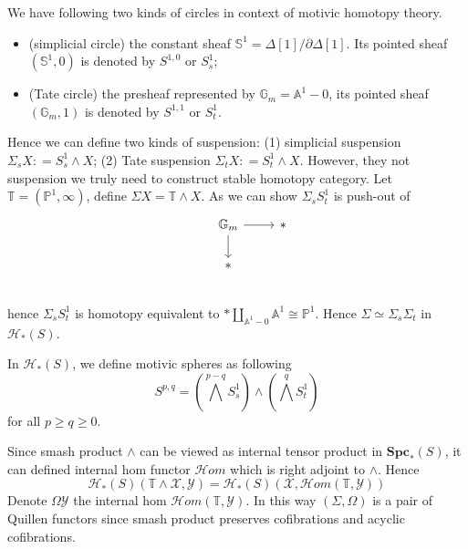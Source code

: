 \documentclass[b5paper,10pt]{article}
\begin{document}
We have following two kinds of circles in context of motivic homotopy theory.
\begin{itemize}
	\item(simplicial circle) the constant sheaf $\mathbb{S}^1= \Delta[1]/\partial \Delta[1]$. Its pointed sheaf $(\mathbb{S}^1,0)$ is denoted by $S^{1,0}$ or $S_s^1$;
	\item(Tate circle) the presheaf represented by $\mathbb{G}_m = \mathbb{A}^1-0$, its pointed sheaf $(\mathbb{G}_m,1)$ is denoted by $S^{1,1}$ or $S_t^1$.
\end{itemize}
Hence we can define two kinds of suspension: (1) simplicial suspension $\Sigma_s X \colon = S^1_s \wedge X$; (2) Tate suspension $\Sigma_t X \colon = S_t^1 \wedge X$. However, they not suspension we truly need to construct stable homotopy category. Let $\mathbb{T} = (\mathbb{P}^1,\infty)$, define $\Sigma X = \mathbb{T} \wedge X$. As we can show $\Sigma_s S^1_t$ is  push-out of 
\[
\begin{tikzcd}
&\mathbb{G}_m \ar[r] \ar[d]& * \\
&* &\\
\end{tikzcd}
\]
hence $\Sigma_s S^1_t$ is homotopy equivalent to $* \coprod_{\mathbb{A}^1-0} \mathbb{A}^1 \cong \mathbb{P}^1$. Hence $\Sigma \simeq \Sigma_s \Sigma_t$ in $\mathcal{H}_*(S)$.
\begin{secdefn}
	In $\mathcal{H}_*(S)$, we define motivic spheres as following
	\[
	S^{p,q}= (\bigwedge^{p-q}S^1_s) \wedge(\bigwedge^q S^1_t)
	\]
	for all $p \geq q \geq 0$.
\end{secdefn}
Since smash product $\wedge$ can be viewed as internal tensor product in $\mathbf{Spc}_*(S)$, it can defined internal hom functor $\mathcal{H}om$ which is right adjoint to $\wedge$. Hence 
\[
\mathcal{H}_*(S)(\mathbb{T} \wedge \mathcal{X}, \mathcal{Y}) = \mathcal{H}_*(S)(\mathcal{X},\mathcal{H}om(\mathbb{T},\mathcal{Y}))
\]
Denote $\Omega \mathcal{Y}$ the internal hom $\mathcal{H}om(\mathbb{T},\mathcal{Y})$. In this way $(\Sigma, \Omega)$ is a pair of Quillen functors since smash product preserves cofibrations and acyclic cofibrations. 
\end{document}
